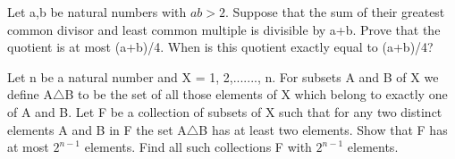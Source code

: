\item Let a,b be natural numbers with $ab > 2$. Suppose that the sum of their greatest common divisor and least common multiple is divisible by a+b. Prove that the quotient is at most (a+b)/4. When is this quotient exactly equal to (a+b)/4?

\item Let n be a natural number and X = {1, 2,......., n}. For subsets A and B of X we define A$\triangle$B to be the set of all those elements of X which belong to exactly one of A and B. Let F be a collection of subsets of X such that for any two distinct elements A and B in F the set A$\triangle$B has at least two elements. Show that F has at most $2^{n-1}$ elements. Find all such collections F with $2^{n-1}$ elements.



